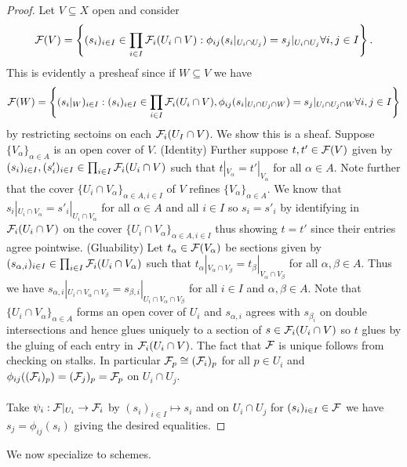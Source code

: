 \begin{proof}
    Let $V\subseteq X$ open and consider 
    $$\mathcal{F}(V)=\left\{(s_{i})_{i\in I}\in\prod_{i\in I}\mathcal{F}_{i}(U_{i}\cap V):\phi_{ij}(s_{i}|_{U_{i}\cap U_{j}})=s_{j}|_{U_{i}\cap U_{j}}\forall i,j\in I\right\}.$$
    This is evidently a presheaf since if $W\subseteq V$ we have 
    $$\mathcal{F}(W)=\left\{(s_{i}|_{W})_{i\in I}: (s_{i})_{i\in I}\in\prod_{i\in I}\mathcal{F}_{i}(U_{i}\cap V), \phi_{ij}(s_{i}|_{U_{i}\cap U_{j}\cap W})=s_{j}|_{U_{i}\cap U_{j}\cap W}\forall i,j\in I\right\}$$
    by restricting sectoins on each $\mathcal{F}_{i}(U_{I}\cap V)$. We show this is a sheaf. Suppose $\{V_{\alpha}\}_{\alpha\in A}$ is an open cover of $V$. (Identity) Further suppose $t,t'\in\mathcal{F}(V)$ given by $(s_{i})_{i\in I}, (s'_{i})_{i\in I}\in \prod_{i\in I}\mathcal{F}_{i}(U_{i}\cap V)$ such that $t|_{V_{\alpha}}=t'|_{V_{\alpha}}$ for all $\alpha\in A$. Note further that the cover $\{U_{i}\cap V_{\alpha}\}_{\alpha\in A, i\in I}$ of $V$ refines $\{V_{\alpha}\}_{\alpha\in A}$. We know that $s_{i}|_{U_{i}\cap V_{\alpha}}=s'_{i}|_{U_{i}\cap V_{\alpha}}$ for all $\alpha\in A$ and all $i\in I$ so $s_{i}=s'_{i}$ by identifying in $\mathcal{F}_{i}(U_{i}\cap V)$ on the cover $\{U_{i}\cap V_{\alpha}\}_{\alpha\in A, i\in I}$ thus showing $t=t'$ since their entries agree pointwise. (Gluability) Let $t_{\alpha}\in\mathcal{F}(V_{\alpha})$ be sections given by $(s_{\alpha,i})_{i\in I}\in\prod_{i\in I}\mathcal{F}_{i}(U_{i}\cap V_{\alpha})$ such that $t_{\alpha}|_{V_{\alpha}\cap V_{\beta}}=t_{\beta}|_{V_{\alpha}\cap V_{\beta}}$ for all $\alpha,\beta\in A$. Thus we have $s_{\alpha, i}|_{U_{i}\cap V_{\alpha}\cap V_{\beta}}=s_{\beta,i}|_{U_{i}\cap V_{\alpha}\cap V_{\beta}}$ for all $i\in I$ and $\alpha,\beta\in A$. Note that $\{U_{i}\cap V_{\alpha}\}_{\alpha\in A}$ forms an open cover of $U_{i}$ and $s_{\alpha, i}$ agrees with $s_{\beta_{i}}$ on double intersections and hence glues uniquely to a section of $s\in\mathcal{F}_{i}(U_{i}\cap V)$ so $t$ glues by the gluing of each entry in $\mathcal{F}_{i}(U_{i}\cap V)$. The fact that $\mathcal{F}$ is unique follows from checking on stalks. In particular $\mathcal{F}_{p}\cong(\mathcal{F}_{i})_{p}$ for all $p\in U_{i}$ and $\phi_{ij}((\mathcal{F}_{i})_{p})=(\mathcal{F}_{j})_{p}=\mathcal{F}_{p}$ on $U_{i}\cap U_{j}$. 
    \\\\
    Take $\psi_{i}:\mathcal{F}|_{U_{i}}\to\mathcal{F}_{i}$ by $(s_{i})_{i\in I}\mapsto s_{i}$ and on $U_{i}\cap U_{j}$ for $(s_{i})_{i\in I}\in\mathcal{F}$ we have $s_{j}=\phi_{ij}(s_{i})$ giving the desired equalities.  
\end{proof}
We now specialize to schemes. 
